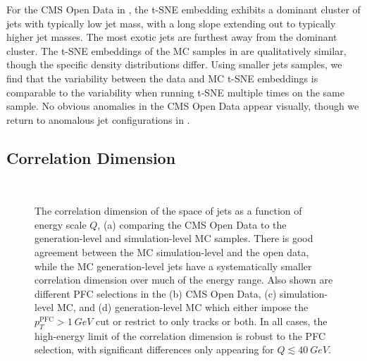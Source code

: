 \documentclass[aps,prd,twocolumn,preprintnumbers,nofootinbib,longbibliography,floatfix,superscriptaddress]{revtex4-1}
\begin{document}
For the CMS Open Data in , the t-SNE embedding exhibits a dominant cluster of jets with typically low jet mass, with a long slope extending out to typically higher jet masses.
%
The most exotic jets are furthest away from the dominant cluster.
%
The t-SNE embeddings of the MC samples in  are qualitatively similar, though the specific density distributions differ.
%
Using smaller jets samples, we find that the variability between the data and MC t-SNE embeddings is comparable to the variability when running t-SNE multiple times on the same sample.
%
No obvious anomalies in the CMS Open Data appear visually, though we return to anomalous jet configurations in .


\subsection{Correlation Dimension}
\label{subsec:emd_dimension}


\begin{figure*}[p]
\\
\caption{The correlation dimension of the space of jets as a function of energy scale $Q$, (a) comparing the CMS Open Data to the generation-level and simulation-level MC samples.
%
There is good agreement between the MC simulation-level and the open data, while the MC generation-level jets have a systematically smaller correlation dimension over much of the energy range.
%
 Also shown are different PFC selections in the (b) CMS Open Data, (c) simulation-level MC, and (d) generation-level MC which either impose the $p_T^\text{PFC} > \SI{1}{GeV}$ cut or restrict to only tracks or both.
In all cases, the high-energy limit of the correlation dimension is robust to the PFC selection, with significant differences only appearing for $Q \lesssim \SI{40}{GeV}$.
}
\label{fig:corrdim_all}
\end{figure*}
\end{document}
